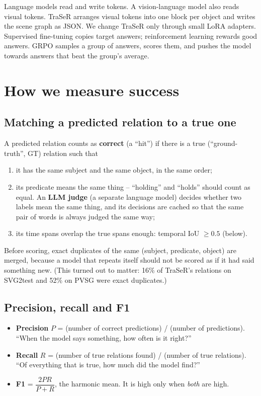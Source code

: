 \documentclass[11pt,openany]{book}
\begin{document}
\begin{summarybox}
Language models read and write tokens. A vision-language model also reads visual tokens. TraSeR arranges visual tokens into one
block per object and writes the scene graph as JSON. We change TraSeR only through small LoRA adapters. Supervised fine-tuning
copies target answers; reinforcement learning rewards good answers. GRPO samples a group of answers, scores them, and pushes the
model towards answers that beat the group's average.
\end{summarybox}

\chapter{How we measure success}\label{ch:measure}

\section{Matching a predicted relation to a true one}
A predicted relation counts as \textbf{correct} (a ``hit'') if there is a true (``ground-truth'', GT) relation such that
\begin{enumerate}
  \item it has the same subject and the same object, in the same order;
  \item its predicate means the same thing -- ``holding'' and ``holds'' should count as equal. An \textbf{LLM judge} (a separate
  language model) decides whether two labels mean the same thing, and its decisions are cached so that the same pair of words is
  always judged the same way;
  \item its time spans overlap the true spans enough: temporal IoU $\ge 0.5$ (below).
\end{enumerate}
Before scoring, exact duplicates of the same (subject, predicate, object) are merged, because a model that repeats itself should
not be scored as if it had said something new. (This turned out to matter: 16\% of TraSeR's relations on SVG2test and 52\% on PVSG
were exact duplicates.)

\section{Precision, recall and F1}
\begin{itemize}
  \item \textbf{Precision} $P$ = (number of correct predictions) / (number of predictions). ``When the model says something, how
  often is it right?''
  \item \textbf{Recall} $R$ = (number of true relations found) / (number of true relations). ``Of everything that is true, how
  much did the model find?''
  \item \textbf{F1} = $\dfrac{2PR}{P+R}$, the harmonic mean. It is high only when \emph{both} are high.
\end{itemize}
\end{document}
